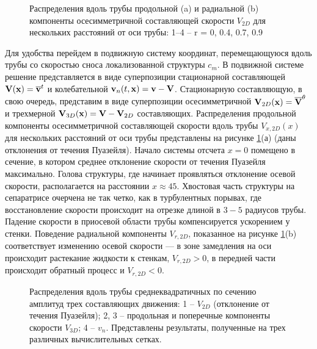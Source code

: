 \begin{figure}
\caption{Распределения вдоль трубы продольной (a) и радиальной (b) компоненты осесимметричной составляющей скорости $V_{2D}$ для нескольких расстояний от оси трубы: 1–4 – r = 0, 0.4, 0.7, 0.9}
\label{U2D_pic}
\end{figure}

Для удобства перейдем в подвижную систему координат, перемещающуюся вдоль трубы со скоростью сноса локализованной структуры $c_m$. В подвижной системе решение представляется в виде суперпозиции стационарной составляющей $\mathbf{V}(\mathbf{x}) = \overline{\mathbf{v}}^t$ и колебательной $\mathbf{v}_n(t,\mathbf{x}) = \mathbf{v} - \mathbf{V}$. Стационарную составляющую, в свою очередь, представим в виде суперпозиции осесимметричной $\mathbf{V}_{2D}(\mathbf{x}) = \overline{\mathbf{V}}^{\theta}$ и трехмерной $\mathbf{V}_{3D}(\mathbf{x})=\mathbf{V} - \mathbf{V}_{2D}$ составляющих. Распределения продольной компоненты осесимметричной составляющей скорости вдоль трубы $V_{x,2D}(x)$ для нескольких расстояний от оси трубы представлены на рисунке \ref{U2D_pic}(а) (даны отклонения от течения Пуазейля). Начало системы отсчета $x=0$ помещено в сечение, в котором среднее отклонение скорости от течения Пуазейля максимально. Голова структуры, где начинает проявляться отклонение осевой скорости, располагается на расстоянии $x \approx 45$. Хвостовая часть структуры на сепаратрисе очерчена не так четко, как в турбулентных порывах, где восстановление скорости происходит на отрезке длиной в $3-5$ радиусов трубы.  Падение скорости в приосевой области трубы компенсируется ускорением у стенки. Поведение радиальной компоненты $V_{r,2D}$, показанное на рисунке \ref{U2D_pic}(b) соответствует изменению осевой скорости --- в зоне замедления на оси происходит растекание жидкости к стенкам, $V_{r,2D}>0$, в передней части происходит обратный процесс и $V_{r,2D}<0$.

\begin{figure}
\caption{Распределения вдоль трубы среднеквадратичных по сечению амплитуд трех составляющих движения: 1 -- $V_{2D}$ (отклонение от течения Пуазейля); 2, 3 -- продольная и поперечные компоненты скорости $V_{3D}$; 4 -- $v_{n}$. Представлены результаты, полученные на трех различных вычислительных сетках.}
\label{amp_pic}
\end{figure}

